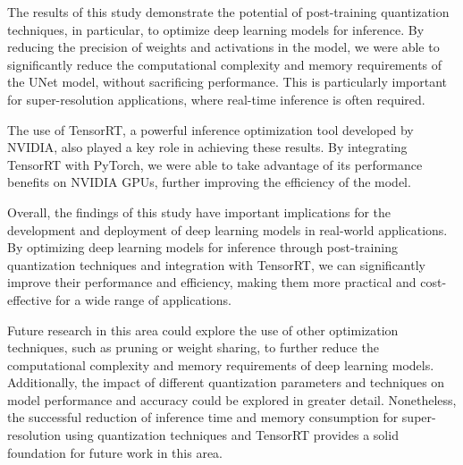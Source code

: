 \label{chap:Conclusions}

The results of this study demonstrate the potential of post-training quantization techniques, in particular, to optimize deep learning models for inference. By reducing the precision of weights and activations in the model, we were able to significantly reduce the computational complexity and memory requirements of the UNet model, without sacrificing performance. This is particularly important for super-resolution applications, where real-time inference is often required.

The use of TensorRT, a powerful inference optimization tool developed by NVIDIA, also played a key role in achieving these results. By integrating TensorRT with PyTorch, we were able to take advantage of its performance benefits on NVIDIA GPUs, further improving the efficiency of the model.

Overall, the findings of this study have important implications for the development and deployment of deep learning models in real-world applications. By optimizing deep learning models for inference through post-training quantization techniques and integration with TensorRT, we can significantly improve their performance and efficiency, making them more practical and cost-effective for a wide range of applications.

Future research in this area could explore the use of other optimization techniques, such as pruning or weight sharing, to further reduce the computational complexity and memory requirements of deep learning models. Additionally, the impact of different quantization parameters and techniques on model performance and accuracy could be explored in greater detail. Nonetheless, the successful reduction of inference time and memory consumption for super-resolution using quantization techniques and TensorRT provides a solid foundation for future work in this area.

